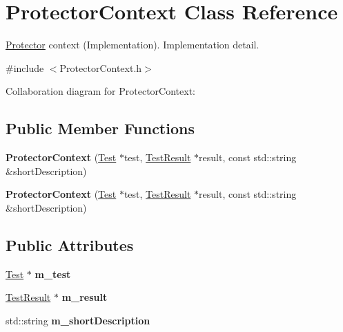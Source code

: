\hypertarget{class_protector_context}{\section{Protector\+Context Class Reference}
\label{class_protector_context}
}


\hyperlink{class_protector}{Protector} context (Implementation). Implementation detail.  




{\ttfamily \#include $<$Protector\+Context.\+h$>$}



Collaboration diagram for Protector\+Context\+:
\subsection*{Public Member Functions}
\begin{DoxyCompactItemize}
\item 
\hypertarget{class_protector_context_a6df4c4e5f8906b5d54f87df3ffc5e89d}{{\bfseries Protector\+Context} (\hyperlink{class_test}{Test} $\ast$test, \hyperlink{class_test_result}{Test\+Result} $\ast$result, const std\+::string \&short\+Description)}\label{class_protector_context_a6df4c4e5f8906b5d54f87df3ffc5e89d}

\item 
\hypertarget{class_protector_context_a6df4c4e5f8906b5d54f87df3ffc5e89d}{{\bfseries Protector\+Context} (\hyperlink{class_test}{Test} $\ast$test, \hyperlink{class_test_result}{Test\+Result} $\ast$result, const std\+::string \&short\+Description)}\label{class_protector_context_a6df4c4e5f8906b5d54f87df3ffc5e89d}

\end{DoxyCompactItemize}
\subsection*{Public Attributes}
\begin{DoxyCompactItemize}
\item 
\hypertarget{class_protector_context_af4d031f15e2ab6eb498ea884d103ae82}{\hyperlink{class_test}{Test} $\ast$ {\bfseries m\+\_\+test}}\label{class_protector_context_af4d031f15e2ab6eb498ea884d103ae82}

\item 
\hypertarget{class_protector_context_a0c52b3b174ace9ff3313ef715a1930e7}{\hyperlink{class_test_result}{Test\+Result} $\ast$ {\bfseries m\+\_\+result}}\label{class_protector_context_a0c52b3b174ace9ff3313ef715a1930e7}

\item 
\hypertarget{class_protector_context_a7ca719687854e56d5f0433a0efaba983}{std\+::string {\bfseries m\+\_\+short\+Description}}\label{class_protector_context_a7ca719687854e56d5f0433a0efaba983}

\end{DoxyCompactItemize}


